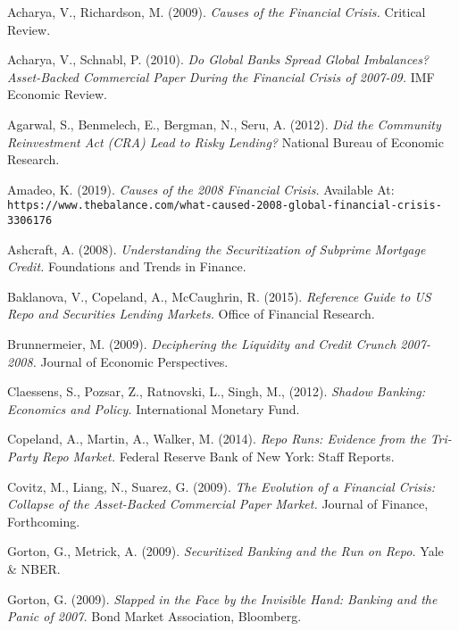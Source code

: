 \documentclass[11pt, english]{article}
\begin{document}
\begin{thebibliography}{9}

		Acharya, V., Richardson, M. (2009).
		\textsl{Causes of the Financial Crisis.}
		Critical Review.

		Acharya, V., Schnabl, P. (2010).
		\textsl{Do Global Banks Spread Global Imbalances? Asset-Backed Commercial Paper During the Financial Crisis of 2007-09.}
		IMF Economic Review.
                 
		Agarwal, S., Benmelech, E., Bergman, N., Seru, A. (2012).
		\textsl{Did the Community Reinvestment Act (CRA) Lead to Risky Lending?}
		National Bureau of Economic Research.
                
		Amadeo, K. (2019).
		\textsl{Causes of the 2008 Financial Crisis.}
		Available At:
		\texttt{https://www.thebalance.com/what-caused-2008-global-financial-crisis-3306176}
                     
		Ashcraft, A. (2008).
		\textsl{Understanding the Securitization of Subprime Mortgage Credit.}
		Foundations and Trends in Finance.

		Baklanova, V., Copeland, A., McCaughrin, R. (2015).
		\textsl{Reference Guide to US Repo and Securities Lending Markets.}
		Office of Financial Research.
                
		Brunnermeier, M. (2009).
		\textsl{Deciphering the Liquidity and Credit Crunch 2007-2008.}
		Journal of Economic Perspectives.
                     
		Claessens, S., Pozsar, Z., Ratnovski, L., Singh, M., (2012).
		\textsl{Shadow Banking: Economics and Policy.}
		International Monetary Fund.

		Copeland, A., Martin, A., Walker, M. (2014).
		\textsl{Repo Runs: Evidence from the Tri-Party Repo Market.}
		Federal Reserve Bank of New York: Staff Reports.
                
		Covitz, M., Liang, N., Suarez, G. (2009).
		\textsl{The Evolution of a Financial Crisis: Collapse of the Asset-Backed Commercial Paper Market.}
		Journal of Finance, Forthcoming.
                     
		Gorton, G., Metrick, A. (2009).
		\textsl{Securitized Banking and the Run on Repo.}
		Yale \& NBER.

		Gorton, G. (2009).
		\textsl{Slapped in the Face by the Invisible Hand: Banking and the Panic of 2007.}
		Bond Market Association, Bloomberg.
                

\end{thebibliography}
\end{document}
